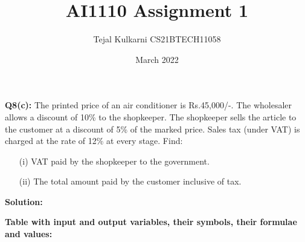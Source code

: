 \documentclass[journal,12pt,two column]{IEEEtran}
\title{AI1110 Assignment 1}
\author{Tejal Kulkarni CS21BTECH11058}
\date{March 2022}
\begin{document}
\maketitle
\textbf{Q8(c):} The printed price of an air conditioner is  Rs.45,000/-. The wholesaler allows a discount of 10\% to the shopkeeper. The shopkeeper sells the article to the customer at a discount of 5\% of the marked price. Sales tax (under VAT) is charged at the rate of 12\% at every stage. Find:
\begin{enumerate}
\item[(i)]VAT paid by the shopkeeper to the government.
\item[(ii)]The total amount paid by the customer inclusive of tax. 
\end{enumerate}
\textbf{Solution:}
\begin{table}[ht!]
\caption{\textbf{Table with input and output variables, their symbols, their formulae and values:}}
    \label{table:1}
   
\end{table}
\end{document}
